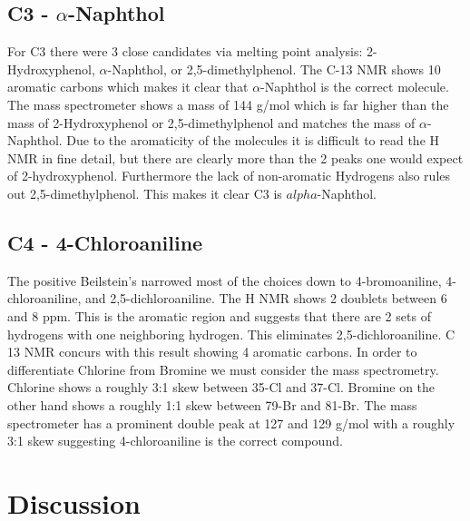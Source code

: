 \documentclass{article}
\begin{document}
	\subsection{C3 - $\alpha$-Naphthol}
	For C3 there were 3 close candidates via melting point analysis: 2-Hydroxyphenol, $\alpha$-Naphthol, or 2,5-dimethylphenol. The C-13 NMR shows 10 aromatic carbons which makes it clear that $\alpha$-Naphthol is the correct molecule. The mass spectrometer shows a mass of 144 g/mol which is far higher than the mass of 2-Hydroxyphenol or 2,5-dimethylphenol and matches the mass of $\alpha$-Naphthol. Due to the aromaticity of the molecules it is difficult to read the H NMR in fine detail, but there are clearly more than the 2 peaks one would expect of 2-hydroxyphenol. Furthermore the lack of non-aromatic Hydrogens also rules out 2,5-dimethylphenol. This makes it clear C3 is $alpha$-Naphthol.
	
	\subsection{C4 - 4-Chloroaniline}
	The positive Beilstein's narrowed most of the choices down to 4-bromoaniline, 4-chloroaniline, and 2,5-dichloroaniline. The H NMR shows 2 doublets between 6 and 8 ppm. This is the aromatic region and suggests that there are 2 sets of hydrogens with one neighboring hydrogen. This eliminates 2,5-dichloroaniline. C 13 NMR concurs with this result showing 4 aromatic carbons. In order to differentiate Chlorine from Bromine we must consider the mass spectrometry. Chlorine shows a roughly 3:1 skew between 35-Cl and 37-Cl. Bromine on the other hand shows a roughly 1:1 skew between 79-Br and 81-Br. The mass spectrometer has a prominent double peak at 127 and 129 g/mol with a roughly 3:1 skew suggesting 4-chloroaniline is the correct compound.
	\pagebreak
	\section{Discussion}
\end{document}
